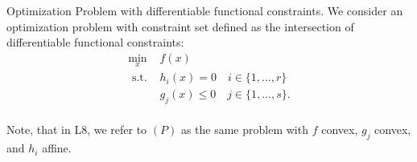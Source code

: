 
\begin{remark}[L7.1]{Optimization Problem with differentiable functional constraints.}
    We consider an optimization problem with constraint set defined as the intersection of differentiable functional constraints: 
    \begin{equation}
        \begin{array}{ll}
            \min _x & f(x) \\
            \text { s.t. } & h_i(x)=0 \quad i \in\{1, \ldots, r\} \\
            & g_j(x) \leq 0 \quad j \in\{1, \ldots, s\}.
        \end{array} \tag{1}
    \end{equation}
    \vspace{-7pt}\\
    Note, that in L8, we refer to $(P)$ as the same problem with $f$ convex, $g_j$ convex, and $h_i$ affine.
\end{remark}


